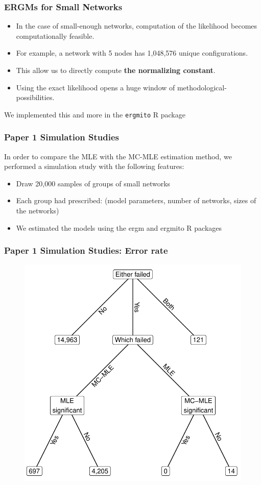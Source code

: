 \documentclass[aspectratio=169, 10pt]{beamer}\usepackage[]{graphicx}\usepackage[]{color}
\newcommand{\ergmitopkg}[0]{\texttt{ergmito}}
\begin{document}
\begin{frame}[label=ergmito]
\frametitle{ERGMs for Small Networks}

\pause
\begin{itemize}[<+->]
\item In the case of small-enough networks, computation of the likelihood becomes
computationally feasible.
\item For example, a network with 5 nodes has 1,048,576
unique configurations.
\item This allow us to directly compute {\bf\color{normconst} the normalizing constant}.
\item Using the exact likelihood opens a huge window of methodological-possibilities.
\end{itemize}\pause
We implemented this and more in the \ergmitopkg{} R package \hyperlink{ergmitopkg}{}
\end{frame}

\begin{frame}
\frametitle{Paper 1 Simulation Studies}

In order to compare the MLE with the MC-MLE estimation method, we performed a simulation study with the following features:\pause

\begin{itemize}[<+->]
\item Draw 20,000 samples of groups of small networks
\item Each group had prescribed: (model parameters, number of networks, sizes of the networks)
\item We estimated the models using the ergm and ergmito R packages
\end{itemize}

\end{frame}

\begin{frame}
\frametitle{Paper 1 Simulation Studies: Error rate}

\begin{figure}
\centering
\includegraphics[width=.4\linewidth]{failed-tree.pdf}
\end{figure}

\end{frame}
\end{document}
